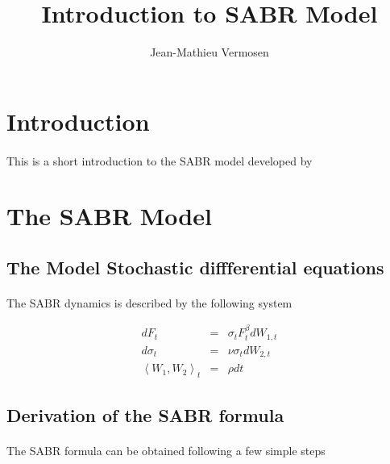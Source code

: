 \documentclass{article}
\begin{document}
%
\title{Introduction to SABR Model}
\author{Jean-Mathieu Vermosen}



\section{Introduction}
\paragraph{} This is a short introduction to the SABR model developed by \cite{hagan2002}

\section{The SABR Model}
\subsection{The Model Stochastic diffferential equations}
\paragraph{} The SABR dynamics is described by the following system

\begin{eqnarray}
    dF_t      & = & \sigma_t F_t^\beta dW_{1, t}\label{hagan:eq1}\\
    d\sigma_t & = & \nu\sigma_t dW_{2, t}\label{hagan:eq2}\\
	\left<W_{1}, W_{2}\right>_t & = & \rho dt\label{hagan:eq3}
\end{eqnarray}

\subsection{Derivation of the SABR formula}
%
\paragraph{} The SABR formula can be obtained following a few simple steps
%
\end{document}
